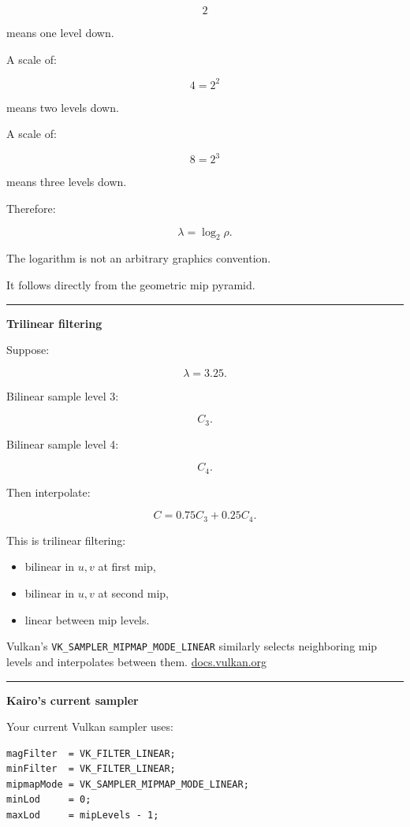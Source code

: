 \[
2
\]

means one level down.

A scale of:

\[
4=2^2
\]

means two levels down.

A scale of:

\[
8=2^3
\]

means three levels down.

Therefore:

\[
\lambda=\log_2\rho.
\]

The logarithm is not an arbitrary graphics convention.

It follows directly from the geometric mip pyramid.

\begin{center}\rule{0.5\linewidth}{0.5pt}\end{center}

\textbf{Trilinear filtering}

Suppose:

\[
\lambda=3.25.
\]

Bilinear sample level 3:

\[
C_3.
\]

Bilinear sample level 4:

\[
C_4.
\]

Then interpolate:

\[
\boxed{
C=
0.75C_3+0.25C_4.
}
\]

This is trilinear filtering:

\begin{itemize}
\tightlist
\item
  bilinear in \(u,v\) at first mip,
\item
  bilinear in \(u,v\) at second mip,
\item
  linear between mip levels.
\end{itemize}

Vulkan's \texttt{VK\_SAMPLER\_MIPMAP\_MODE\_LINEAR} similarly selects neighboring mip levels and interpolates between them. \href{https://docs.vulkan.org/tutorial/latest/09_Generating_Mipmaps.html?utm_source=chatgpt.com}{docs.vulkan.org}

\begin{center}\rule{0.5\linewidth}{0.5pt}\end{center}

\textbf{Kairo's current sampler}

Your current Vulkan sampler uses:

\begin{verbatim}
magFilter  = VK_FILTER_LINEAR;
minFilter  = VK_FILTER_LINEAR;
mipmapMode = VK_SAMPLER_MIPMAP_MODE_LINEAR;
minLod     = 0;
maxLod     = mipLevels - 1;
\end{verbatim}

